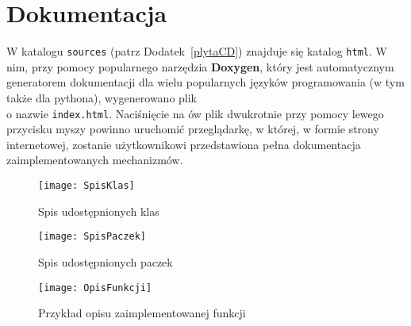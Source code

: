 \section{Dokumentacja}
    W katalogu \texttt{sources} (patrz Dodatek~\ref{plytaCD}) znajduje się katalog \texttt{html}. W nim, przy pomocy popularnego narzędzia \textbf{Doxygen},
    który jest automatycznym generatorem dokumentacji dla wielu popularnych języków programowania (w tym także dla pythona), wygenerowano plik \\
    o nazwie 
    \texttt{index.html}. Naciśnięcie na ów plik dwukrotnie przy pomocy lewego przycisku myszy powinno uruchomić przeglądarkę, w której, w formie strony
    internetowej, zostanie użytkownikowi przedstawiona pełna dokumentacja zaimplementowanych mechanizmów. \\

    \begin{figure}[H]
        \texttt{[image: SpisKlas]}
        \centering
        \caption{Spis udostępnionych klas}
    \end{figure}

    \begin{figure}[H]
        \texttt{[image: SpisPaczek]}
        \centering
        \caption{Spis udostępnionych paczek}
    \end{figure}

    \begin{figure}[H]
        \texttt{[image: OpisFunkcji]}
        \centering
        \caption{Przykład opisu zaimplementowanej funkcji}
    \end{figure}
